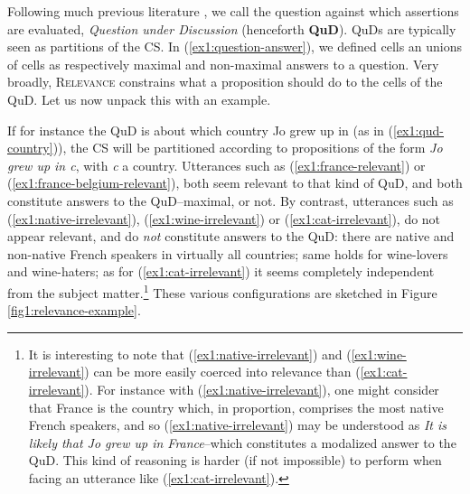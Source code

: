 Following much previous literature \citep{VanKuppevelt1995a,VanKuppevelt1995b,Roberts1996,Roberts2012,Ginzburg1996,Buring2003}, we call the question against which assertions are evaluated, \textit{Question under Discussion} (henceforth \textbf{QuD}). QuDs are typically seen as partitions of the CS. In
(\ref{ex1:question-answer}), we defined cells an unions of cells as respectively maximal and non-maximal answers to a question. Very broadly, \textsc{Relevance} constrains what a proposition should do to the cells of the QuD. Let us now unpack this with an example.

If for instance the QuD is about which country Jo grew up in (as in (\ref{ex1:qud-country})), the CS will be partitioned according to propositions of the form \textit{Jo grew up in c}, with \textit{c} a country. Utterances such as (\ref{ex1:france-relevant}) or (\ref{ex1:france-belgium-relevant}), both seem relevant to that kind of QuD, and both constitute answers to the QuD--maximal, or not. By contrast, utterances such as (\ref{ex1:native-irrelevant}), (\ref{ex1:wine-irrelevant}) or (\ref{ex1:cat-irrelevant}), do not appear relevant, and do \textit{not} constitute answers to the QuD: there are native and non-native French speakers in virtually all countries; same holds for wine-lovers and wine-haters; as for (\ref{ex1:cat-irrelevant}) it seems completely independent from the subject matter.\footnote{It is interesting to note that (\ref{ex1:native-irrelevant}) and (\ref{ex1:wine-irrelevant}) can be more easily coerced into relevance than (\ref{ex1:cat-irrelevant}). For instance with (\ref{ex1:native-irrelevant}), one might consider that France is the country which, in proportion, comprises the most native French speakers, and so (\ref{ex1:native-irrelevant}) may be understood as \textit{It is likely that Jo grew up in France}--which constitutes a modalized answer to the QuD. This kind of reasoning is harder (if not impossible) to perform when facing an utterance like (\ref{ex1:cat-irrelevant}).} These various configurations are sketched in Figure \ref{fig1:relevance-example}.

\begin{exe}
	\label{ex1:qud-country}
	\begin{xlist}
		\label{ex1:france-relevant}
		\label{ex1:france-belgium-relevant}
		\label{ex1:native-irrelevant}
		\label{ex1:wine-irrelevant}
		\label{ex1:cat-irrelevant}
	\end{xlist}
\end{exe}


